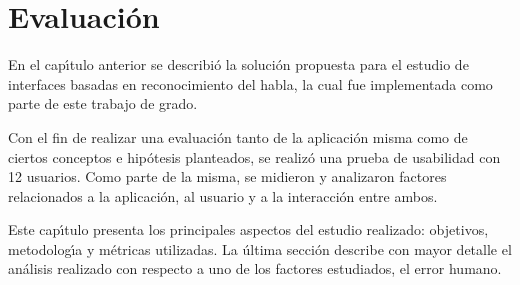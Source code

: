\chapter{Evaluaci\'on}
\label{sec:evaluacion}


En el cap{\'\i}tulo anterior se describi\'o la soluci\'on propuesta para el estudio de interfaces basadas en
reconocimiento del habla, la cual fue implementada como parte de este trabajo de grado.

Con el fin de realizar una evaluaci\'on tanto de la aplicaci\'on misma como de ciertos conceptos 
e hip\'otesis planteados, se realiz\'o una prueba de usabilidad con 12 usuarios. 
Como parte de la misma, se midieron y analizaron factores relacionados a la aplicaci\'on,
al usuario y a la interacci\'on entre ambos.

Este cap{\'\i}tulo presenta los principales aspectos del estudio realizado: objetivos, metodolog{\'\i}a
y m\'etricas utilizadas. La última sección describe con mayor detalle el análisis realizado con respecto
a uno de los factores estudiados, el error humano.






